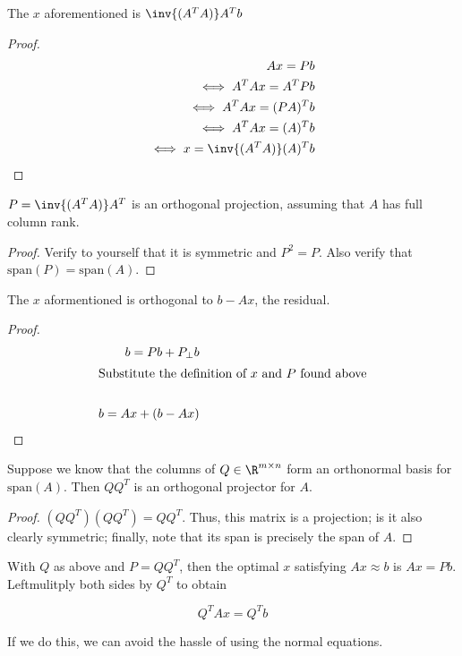 \documentclass[../main.tex]{subfiles}
\begin{document}
\begin{corollary}
    The $x$ aforementioned is $\inv{(A^TA)}A^Tb$ 
\end{corollary}
\begin{proof}
    \begin{align*}
        Ax = Pb \\
        \iff A^TAx = A^TPb \\
        \iff A^TAx = (PA)^Tb \\
        \iff A^TAx = (A)^Tb \\
        \iff x = \inv{(A^TA)}(A)^Tb \\
    \end{align*}
\end{proof}

\begin{proposition}
    $P = \inv{(A^TA)}A^T$ is an orthogonal projection, assuming
    that $A$ has full column rank.
\end{proposition}
\begin{proof}
    Verify to yourself that it is symmetric and $P^2 = P$. Also verify that $\text{span}(P) = \text{span}(A)$.
\end{proof}

\begin{corollary}
    The $x$ aformentioned is orthogonal to $b- Ax$, the residual.
\end{corollary}

\begin{proof}
    \begin{align*}
        b = Pb + P_{\perp}b \\
        \intertext{Substitute the definition of $x$ and $P$ found above}  \\
        b = Ax + (b - Ax) \\
    \end{align*}
\end{proof}

\begin{proposition}
    Suppose we know that the columns of $Q \in \R^{m \times n}$ form an orthonormal basis for $\text{span}(A)$. Then $QQ^T$ is an orthogonal projector for $A$.
\end{proposition}
\begin{proof}
    $(QQ^T)(QQ^T) = QQ^T$. Thus, this matrix is a projection; is it also clearly symmetric; finally, note that its span is precisely the span of $A$.
\end{proof}

\begin{corollary}
    With $Q$ as above and $P = QQ^T$, then the optimal $x$ satisfying $Ax \approx b$ is $Ax = Pb$. Leftmulitply both sides by $Q^T$ to obtain

    \[
        Q^TAx = Q^Tb
    \]

    If we do this, we can avoid the hassle of using the normal equations.
\end{corollary}
\end{document}
